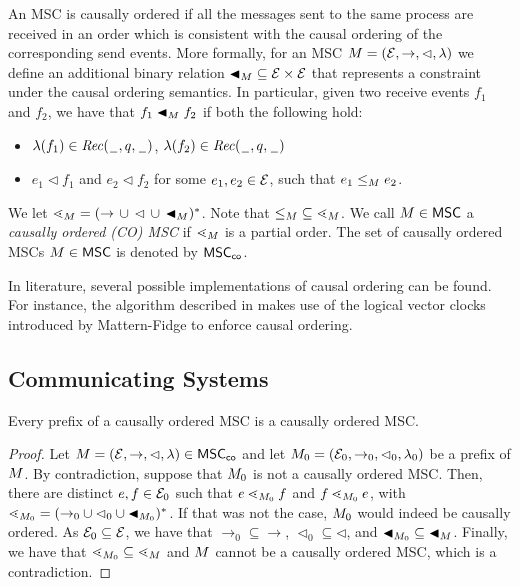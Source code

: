 \documentclass{article}
\begin{document}
An MSC is causally ordered if all the messages sent to the same process are received in an order which is consistent with the causal ordering of the corresponding send events. More formally, for an MSC $M = (\mathcal{E},\to,\lhd,\lambda)$ we define an additional binary relation ${\blacktriangleleft}_M \subseteq \mathcal{E} \times \mathcal{E}$ that represents a constraint
under the causal ordering semantics.  In particular, given two receive events $f_1$ and $f_2$, we have that $f_1 \blacktriangleleft_M f_2$ if both the following hold:
\begin{itemize}\itemsep=0.5ex
	\item $\lambda(f_1) \in {\mathit{Rec}(\hspace{0.1em}\underline{\hspace{0.5em}}\hspace{0.1em},q,\hspace{0.1em}\underline{\hspace{0.5em}}\hspace{0.1em})}$,
	$\lambda(f_2) \in {\mathit{Rec}(\hspace{0.1em}\underline{\hspace{0.5em}}\hspace{0.1em},q,\hspace{0.1em}\underline{\hspace{0.5em}}\hspace{0.1em})}$
	\item $e_1 \lhd f_1$ and $e_2 \lhd f_2$ for some $e_1,e_2 \in \mathcal{E}$, such that $e_1 \le_M e_2$.
\end{itemize}

We let ${\lessdot_M} = ({\to} \,\cup\, {\lhd} \,\cup\, {\blacktriangleleft_M})^\ast$.
Note that ${\le_M} \subseteq {\lessdot_M}$.
We call $M \in \mathsf{MSC}$ a \emph{causally ordered (CO) MSC}
if ${\lessdot_M}$ is a partial order. The set of causally ordered MSCs $M \in \mathsf{MSC}$ is denoted by $\mathsf{MSC}_{\mathsf{co}}$.

\medskip

In literature, several possible implementations of causal ordering can be found. For instance, the algorithm described in \cite{DBLP:conf/wdag/SchiperES89} makes use of the logical vector clocks introduced by Mattern-Fidge \cite{Fidge88timestampsin, Mattern89virtualtime} to enforce causal ordering.

\subsection{Communicating Systems}

\begin{lemma}
\label{lem:co-prefix}
Every prefix of a causally ordered MSC is a causally ordered MSC.
\end{lemma}
\begin{proof}
Let $M = (\mathcal{E}, \to, \lhd, \lambda) \in \mathsf{MSC}_{\mathsf{co}}$ and let $M_0 =
(\mathcal{E}_0, \to_0, \lhd_0, \lambda_0)$ be a prefix of $M$. By contradiction, suppose that $M_0$ is not a	causally ordered MSC. Then, there are distinct $e,f \in \mathcal{E}_0$ such that $e \lessdot_{M_0}f$ and $f \lessdot_{M_0}e$, with ${\lessdot_{M_0}} = ({\rightarrow_0} \cup {\lhd_0} \cup {\blacktriangleleft_{M_0}})^*$. If that was not the case, $M_0$ would indeed be causally ordered. As $\mathcal{E}_0 \subseteq \mathcal{E}$, we have that ${\rightarrow_0} \subseteq {\rightarrow}$, ${\lhd_0} \subseteq {\lhd}$, and ${\blacktriangleleft_{M_0}} \subseteq {\blacktriangleleft_{M}}$. Finally, we have that ${\lessdot_{M_0}} \subseteq {\lessdot_{M}}$ and $M$ cannot be a causally ordered MSC, which is a contradiction.
\end{proof}
\end{document}
